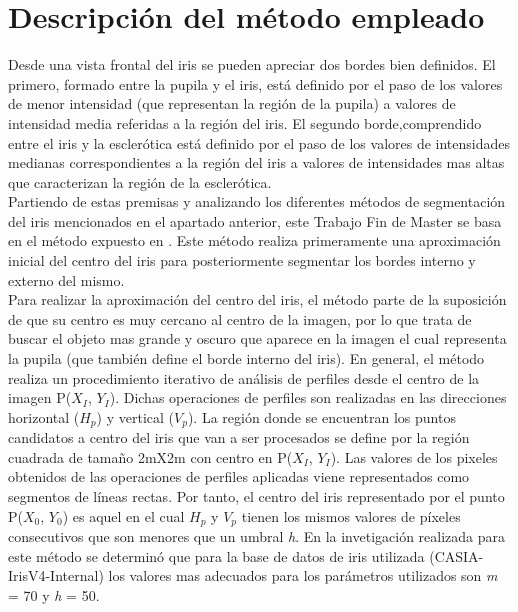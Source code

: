
\section{Descripción del método empleado}

Desde una vista frontal del iris se pueden apreciar dos bordes bien definidos. El primero, formado entre la pupila y el iris, está definido por el paso de los valores de menor intensidad (que representan la región de la pupila) a valores de intensidad media referidas a la región del iris. El segundo borde,comprendido entre el iris y la esclerótica está definido por el paso de los valores de intensidades medianas correspondientes a la región del iris a valores de intensidades mas altas que caracterizan la región de la esclerótica. \\

Partiendo de estas premisas y analizando los diferentes métodos de segmentación del iris mencionados en el apartado anterior, este Trabajo Fin de Master se basa en el método expuesto en \cite{Reference9}. Este método realiza primeramente una aproximación inicial del centro del iris para posteriormente segmentar los bordes interno y externo del mismo. \\

Para realizar la aproximación del centro del iris, el método parte de la suposición de que su centro es muy cercano al centro de la imagen, por lo que trata de buscar el objeto mas grande y oscuro que aparece en la imagen el cual representa la pupila (que también define el borde interno del iris). En general, el método realiza un procedimiento iterativo de análisis de perfiles desde el centro de la imagen P($X_{I}$, $Y_{I}$). Dichas operaciones de perfiles son realizadas en las direcciones horizontal ($H_{p}$) y vertical ($V_{p}$). La región donde se encuentran los puntos candidatos a centro del iris que van a ser procesados se define por la región cuadrada de tamaño 2mX2m con centro en P($X_{I}$, $Y_{I}$). Las valores de los pixeles obtenidos de las operaciones de perfiles aplicadas viene representados como segmentos de líneas rectas. Por tanto, el centro del iris representado por el punto P($X_{0}$, $Y_{0}$) es aquel en el cual $H_{p}$ y $V_{p}$ tienen los mismos valores de píxeles consecutivos que son menores que un umbral \textit{h}. En la invetigación realizada para este método se determinó que para la base de datos de iris utilizada (CASIA-IrisV4-Internal) los valores mas adecuados para los parámetros utilizados son \textit{m} = 70 y \textit{h} = 50. \\

